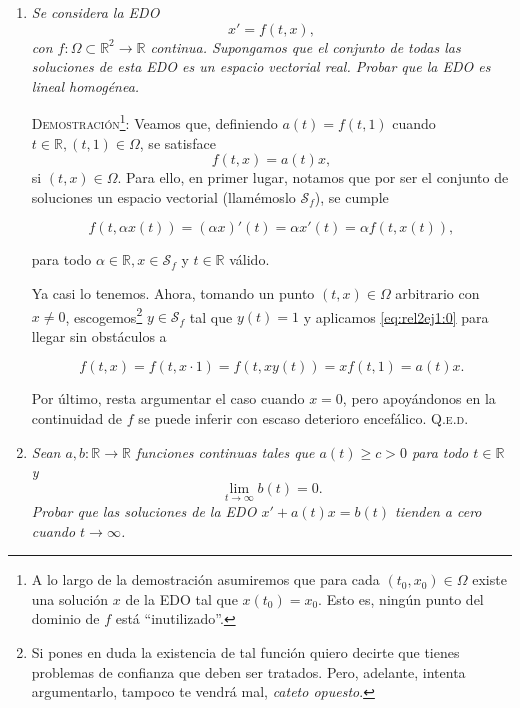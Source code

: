 \documentclass{article}
\begin{document}
\begin{enumerate}
    \item \textit{Se considera la EDO \[x' = f(t, x),\] con $f : \Omega \subset \mathbb{R}^2 \rightarrow \mathbb{R}$ continua.
    Supongamos que el conjunto de todas las soluciones de esta EDO es un espacio vectorial real. Probar que la EDO es lineal homogénea.}

    \vspace{7px}

    \textsc{Demostración}\footnote{A lo largo de la demostración asumiremos que para cada $(t_0, x_0) \in \Omega$ existe una solución $x$ de la EDO tal que $x(t_0) = x_0$. Esto es, ningún punto del dominio de $f$ está ``inutilizado''.}: Veamos que, definiendo $a(t) = f(t, 1)$ cuando $t \in \mathbb{R}, (t, 1) \in \Omega$, se satisface
    \[f(t, x) = a(t)x,\]
    si $(t, x) \in \Omega$.
    Para ello, en primer lugar, notamos que por ser el conjunto de soluciones un espacio vectorial (llamémoslo $\mathcal{S}_f$), se cumple

    \begin{equation}
        f(t, \alpha x(t)) = (\alpha x)'(t) = \alpha x'(t) = \alpha f(t, x(t)),
        \label{eq:rel2ej1:0}
    \end{equation}

    para todo $\alpha \in \mathbb{R}, x \in \mathcal{S}_f$ y $t \in \mathbb{R}$ válido. 
    
    Ya casi lo tenemos. Ahora, tomando un punto $(t, x) \in \Omega$ arbitrario con $x \neq 0$, escogemos\footnote{Si pones en duda la existencia de tal función quiero decirte que tienes problemas de confianza que deben ser tratados. Pero, adelante, intenta argumentarlo, tampoco te vendrá mal, \textit{cateto opuesto}.} $y \in \mathcal{S}_f$ tal que $y(t) = 1$ y aplicamos \eqref{eq:rel2ej1:0} para llegar sin obstáculos a

    \[f(t, x) = f(t, x\cdot1) = f(t, xy(t)) = xf(t, 1) = a(t)x.\]

    Por último, resta argumentar el caso cuando $x = 0$, pero apoyándonos en la continuidad de $f$ se puede inferir con escaso deterioro encefálico. \hfill{\textsc{Q.e.d.}}

    \vspace{12px}

    \item \textit{Sean $a, b : \mathbb{R} \rightarrow \mathbb{R}$ funciones continuas tales que $a(t) \geq c > 0$ para todo $t \in \mathbb{R}$ y \[\lim_{t \to \infty} b(t) = 0.\] Probar que las soluciones de la EDO $x' + a(t)x = b(t)$ tienden a cero cuando $t \to \infty$.}


\end{enumerate}
\end{document}
